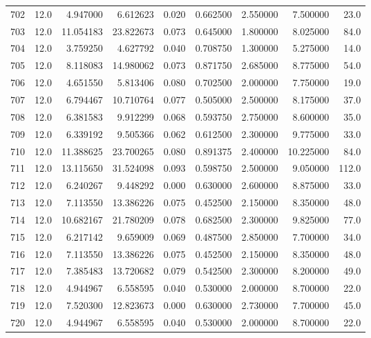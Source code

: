 \begin{tabular}{lrrrrrrrr}
702  &   12.0 &   4.947000 &   6.612623 &  0.020 &  0.662500 &  2.550000 &   7.500000 &   23.0 \\
703  &   12.0 &  11.054183 &  23.822673 &  0.073 &  0.645000 &  1.800000 &   8.025000 &   84.0 \\
704  &   12.0 &   3.759250 &   4.627792 &  0.040 &  0.708750 &  1.300000 &   5.275000 &   14.0 \\
705  &   12.0 &   8.118083 &  14.980062 &  0.073 &  0.871750 &  2.685000 &   8.775000 &   54.0 \\
706  &   12.0 &   4.651550 &   5.813406 &  0.080 &  0.702500 &  2.000000 &   7.750000 &   19.0 \\
707  &   12.0 &   6.794467 &  10.710764 &  0.077 &  0.505000 &  2.500000 &   8.175000 &   37.0 \\
708  &   12.0 &   6.381583 &   9.912299 &  0.068 &  0.593750 &  2.750000 &   8.600000 &   35.0 \\
709  &   12.0 &   6.339192 &   9.505366 &  0.062 &  0.612500 &  2.300000 &   9.775000 &   33.0 \\
710  &   12.0 &  11.388625 &  23.700265 &  0.080 &  0.891375 &  2.400000 &  10.225000 &   84.0 \\
711  &   12.0 &  13.115650 &  31.524098 &  0.093 &  0.598750 &  2.500000 &   9.050000 &  112.0 \\
712  &   12.0 &   6.240267 &   9.448292 &  0.000 &  0.630000 &  2.600000 &   8.875000 &   33.0 \\
713  &   12.0 &   7.113550 &  13.386226 &  0.075 &  0.452500 &  2.150000 &   8.350000 &   48.0 \\
714  &   12.0 &  10.682167 &  21.780209 &  0.078 &  0.682500 &  2.300000 &   9.825000 &   77.0 \\
715  &   12.0 &   6.217142 &   9.659009 &  0.069 &  0.487500 &  2.850000 &   7.700000 &   34.0 \\
716  &   12.0 &   7.113550 &  13.386226 &  0.075 &  0.452500 &  2.150000 &   8.350000 &   48.0 \\
717  &   12.0 &   7.385483 &  13.720682 &  0.079 &  0.542500 &  2.300000 &   8.200000 &   49.0 \\
718  &   12.0 &   4.944967 &   6.558595 &  0.040 &  0.530000 &  2.000000 &   8.700000 &   22.0 \\
719  &   12.0 &   7.520300 &  12.823673 &  0.000 &  0.630000 &  2.730000 &   7.700000 &   45.0 \\
720  &   12.0 &   4.944967 &   6.558595 &  0.040 &  0.530000 &  2.000000 &   8.700000 &   22.0 \\

\end{tabular}
